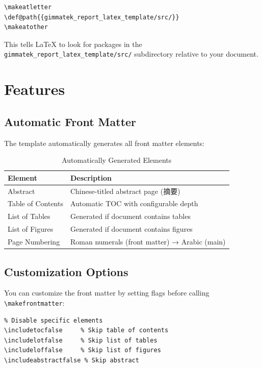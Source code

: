 \documentclass[12pt,a4paper]{gimmatek-report-template}
\makeatletter
\def@path{{gimmatek_report_latex_template/src/}}
\makeatother
\begin{document}
\begin{verbatim}
\makeatletter
\def@path{{gimmatek_report_latex_template/src/}}
\makeatother
\end{verbatim}

This tells LaTeX to look for packages in the \texttt{gimmatek\_report\_latex\_template/src/}
subdirectory relative to your document.

\chapter{Features}

\section{Automatic Front Matter}

The template automatically generates all front matter elements:

\begin{table}[htbp]
\centering
\begin{tabularx}{\textwidth}{l X}
\toprule
\textbf{Element} & \textbf{Description} \\
\midrule
Abstract & Chinese-titled abstract page (摘要) \\
Table of Contents & Automatic TOC with configurable depth \\
List of Tables & Generated if document contains tables \\
List of Figures & Generated if document contains figures \\
Page Numbering & Roman numerals (front matter) → Arabic (main) \\
\bottomrule
\end{tabularx}
\caption{Automatically Generated Elements}
\label{tab:elements}
\end{table}

\section{Customization Options}

You can customize the front matter by setting flags before calling
\texttt{\textbackslash makefrontmatter}:

\begin{verbatim}
% Disable specific elements
\includetocfalse     % Skip table of contents
\includelotfalse     % Skip list of tables
\includeloffalse     % Skip list of figures
\includeabstractfalse % Skip abstract
\end{verbatim}
\end{document}
